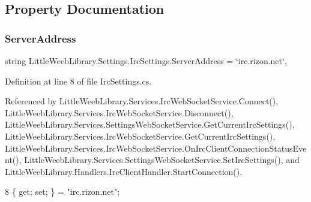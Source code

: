 \subsection{Property Documentation}
\mbox{\label{class_little_weeb_library_1_1_settings_1_1_irc_settings_a99953f00fc76a98af0bd06129876d5ef}} 
\subsubsection{\texorpdfstring{Server\+Address}{ServerAddress}}
{\footnotesize\ttfamily string Little\+Weeb\+Library.\+Settings.\+Irc\+Settings.\+Server\+Address = \char`\"{}irc.\+rizon.\+net\char`\"{}\hspace{0.3cm}{\ttfamily [get]}, {\ttfamily [set]}}



Definition at line 8 of file Irc\+Settings.\+cs.



Referenced by Little\+Weeb\+Library.\+Services.\+Irc\+Web\+Socket\+Service.\+Connect(), Little\+Weeb\+Library.\+Services.\+Irc\+Web\+Socket\+Service.\+Disconnect(), Little\+Weeb\+Library.\+Services.\+Settings\+Web\+Socket\+Service.\+Get\+Current\+Irc\+Settings(), Little\+Weeb\+Library.\+Services.\+Irc\+Web\+Socket\+Service.\+Get\+Current\+Irc\+Settings(), Little\+Weeb\+Library.\+Services.\+Irc\+Web\+Socket\+Service.\+On\+Irc\+Client\+Connection\+Status\+Event(), Little\+Weeb\+Library.\+Services.\+Settings\+Web\+Socket\+Service.\+Set\+Irc\+Settings(), and Little\+Weeb\+Library.\+Handlers.\+Irc\+Client\+Handler.\+Start\+Connection().


\begin{DoxyCode}
8 \{ \textcolor{keyword}{get}; \textcolor{keyword}{set}; \} = \textcolor{stringliteral}{"irc.rizon.net"};
\end{DoxyCode}
\mbox{\label{class_little_weeb_library_1_1_settings_1_1_irc_settings_a13491703ff0e9a96c87743e70002f6fe}} 
